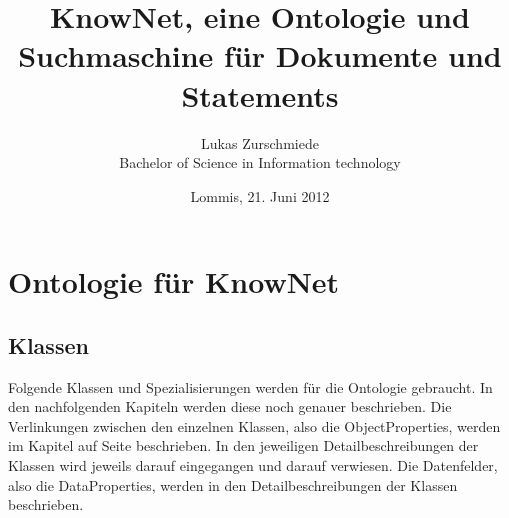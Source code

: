 ﻿\documentclass[
    11pt,
    latin1,
    a4paper,
    oneside
]{scrreprt}
\author{Lukas Zurschmiede\\Bachelor of Science in Information technology}
\date{Lommis, 21. Juni 2012}
\title{KnowNet, eine Ontologie und Suchmaschine f\"ur Dokumente und Statements}
\begin{document}
\maketitle

\newpage
\singlespacing
\tableofcontents

\pagebreak
\onehalfspacing
\setcounter{page}{1}

\chapter{Ontologie f\"ur KnowNet} \label{ontology}


\section{Klassen} \label{sec:class}

Folgende Klassen und Spezialisierungen werden für die Ontologie gebraucht. In den nachfolgenden Kapiteln werden diese noch genauer beschrieben. Die Verlinkungen zwischen den einzelnen Klassen, also die ObjectProperties, werden im Kapitel  auf Seite \pageref{sec:property} beschrieben. In den jeweiligen Detailbeschreibungen der Klassen wird jeweils darauf eingegangen und darauf verwiesen. Die Datenfelder, also die DataProperties, werden in den Detailbeschreibungen der Klassen beschrieben.

\end{document}
